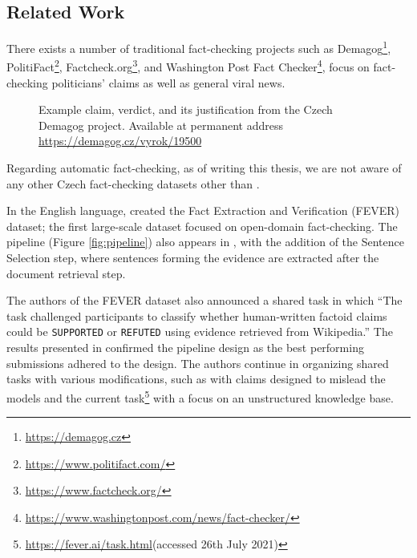 \subsection{Related Work}

There exists a number of traditional fact-checking projects such as Demagog\footnote{\url{https://demagog.cz}}, PolitiFact\footnote{\url{https://www.politifact.com/}}, Factcheck.org\footnote{\url{https://www.factcheck.org/}}, and Washington Post Fact Checker\footnote{\url{https://www.washingtonpost.com/news/fact-checker/}}, focus on fact-checking politicians' claims as well as general viral news. 

\begin{figure}[h!]
    \caption{Example claim, verdict, and its justification from the Czech Demagog project. Available at permanent address \url{https://demagog.cz/vyrok/19500}}
\end{figure}

Regarding automatic fact-checking, as of writing this thesis, we are not aware of any other Czech fact-checking datasets other than \citep{czech-fact}.

In the English language, \citet{fever} created the Fact Extraction and Verification (FEVER) dataset; the first large-scale dataset focused on open-domain fact-checking.
The pipeline (Figure \ref{fig:pipeline}) also appears in \citep{fever}, with the addition of the Sentence Selection step, where sentences forming the evidence are extracted after the document retrieval step.

The authors of the FEVER dataset also announced a shared task \citep{fever-2018-shared-task} in which ``The task challenged participants to classify whether human-written factoid claims could be \texttt{SUPPORTED} or \texttt{REFUTED} using evidence retrieved from Wikipedia.'' The results presented in \citep{fever-2018-shared-task} confirmed the pipeline design as the best performing submissions adhered to the design. The authors continue in organizing shared tasks with various modifications, such as \citep{fever-2019-shared-task-adversial} with claims designed to mislead the models and the current task\footnote{\url{https://fever.ai/task.html}(accessed 26th July 2021)} with a focus on an unstructured knowledge base.


